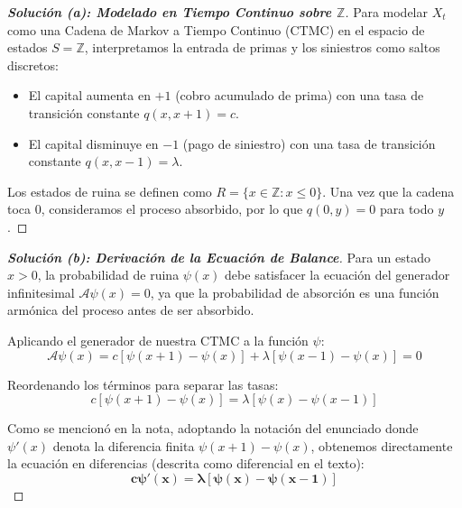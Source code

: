 \documentclass[10pt,a4paper]{article}
\begin{document}
\vspace{2mm}



\begin{proof}[\textbf{Solución (a): Modelado en Tiempo Continuo sobre $\mathbb{Z}$}]
    Para modelar $X_t$ como una Cadena de Markov a Tiempo Continuo (CTMC) en el espacio de estados $S = \mathbb{Z}$, interpretamos la entrada de primas y los siniestros como saltos discretos:
    \begin{itemize}
        \item El capital aumenta en $+1$ (cobro acumulado de prima) con una tasa de transición constante $q(x, x+1) = c$.
        \item El capital disminuye en $-1$ (pago de siniestro) con una tasa de transición constante $q(x, x-1) = \lambda$.
    \end{itemize}
    Los estados de ruina se definen como $R = \{x \in \mathbb{Z} : x \le 0\}$. Una vez que la cadena toca $0$, consideramos el proceso absorbido, por lo que $q(0, y) = 0$ para todo $y$.
\end{proof}

\vspace{5mm}

\begin{proof}[\textbf{Solución (b): Derivación de la Ecuación de Balance}]
    Para un estado $x > 0$, la probabilidad de ruina $\psi(x)$ debe satisfacer la ecuación del generador infinitesimal $\mathcal{A}\psi(x) = 0$, ya que la probabilidad de absorción es una función armónica del proceso antes de ser absorbido.
    
    Aplicando el generador de nuestra CTMC a la función $\psi$:
    \[ \mathcal{A}\psi(x) = c[\psi(x+1) - \psi(x)] + \lambda[\psi(x-1) - \psi(x)] = 0 \]
    
    Reordenando los términos para separar las tasas:
    \[ c[\psi(x+1) - \psi(x)] = \lambda[\psi(x) - \psi(x-1)] \]
    
    Como se mencionó en la nota, adoptando la notación del enunciado donde $\psi'(x)$ denota la diferencia finita $\psi(x+1) - \psi(x)$, obtenemos directamente la ecuación en diferencias (descrita como diferencial en el texto):
    \[ \mathbf{c \psi'(x) = \lambda[\psi(x) - \psi(x-1)]} \]
\end{proof}

\vspace{5mm}
\end{document}
